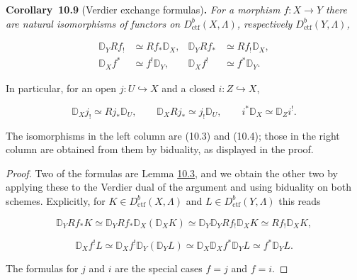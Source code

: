 \documentclass[11pt]{article}
\newenvironment{bpstatement}[2]{\par\addvspace{0.6\baselineskip}\noindent\textbf{#1}#2\textbf{.}\enspace\ignorespaces}
  {\par\addvspace{0.4\baselineskip}}
\newenvironment{bpstatementit}[2]{\begin{bpstatement}{#1}{#2}\itshape\ignorespaces}{\end{bpstatement}}
\begin{document}
\label{bp28}%
\begin{bpstatementit}{Corollary~10.9}{ (Verdier exchange formulas)}
For a morphism \(f:X\to Y\) there are natural isomorphisms of functors on \(D^b_{\mathrm{ctf}}(X,\Lambda)\), respectively \(D^b_{\mathrm{ctf}}(Y,\Lambda)\),

\[
\begin{aligned}
\mathbb D_YRf_!&\simeq Rf_*\mathbb D_X,&
\mathbb D_YRf_*&\simeq Rf_!\mathbb D_X,\\
\mathbb D_Xf^*&\simeq f^!\mathbb D_Y,&
\mathbb D_Xf^!&\simeq f^*\mathbb D_Y.
\end{aligned}
\]

In particular, for an open \(j:U\hookrightarrow X\) and a closed \(i:Z\hookrightarrow X\),

\[
\mathbb D_Xj_!\simeq Rj_*\mathbb D_U,\qquad
\mathbb D_XRj_*\simeq j_!\mathbb D_U,\qquad
i^*\mathbb D_X\simeq\mathbb D_Zi^!.
\]

The isomorphisms in the left column are (10.3) and (10.4); those in the right column are obtained from them by biduality, as displayed in the proof.
\end{bpstatementit}

\begin{proof}[{Proof}]\label{bp29}%
Two of the formulas are Lemma \hyperref[bp10]{10.3}, and we obtain the other two by applying these to the Verdier dual of the argument and using biduality on both schemes. Explicitly, for \(K\in D^b_{\mathrm{ctf}}(X,\Lambda)\) and \(L\in D^b_{\mathrm{ctf}}(Y,\Lambda)\) this reads

\[
\mathbb D_YRf_*K\simeq\mathbb D_YRf_*\mathbb D_X(\mathbb D_XK)
\simeq\mathbb D_Y\mathbb D_YRf_!\mathbb D_XK\simeq Rf_!\mathbb D_XK,
\]

\[
\mathbb D_Xf^!L\simeq\mathbb D_Xf^!\mathbb D_Y(\mathbb D_YL)
\simeq\mathbb D_X\mathbb D_Xf^*\mathbb D_YL\simeq f^*\mathbb D_YL.
\]

The formulas for \(j\) and \(i\) are the special cases \(f=j\) and \(f=i\).
\end{proof}


\end{document}
